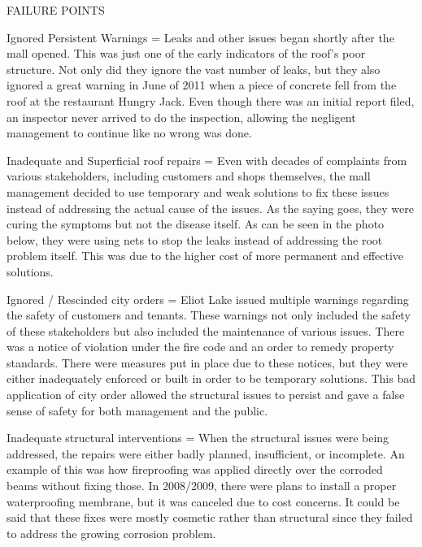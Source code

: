 \documentclass[12pt]{article}
\begin{document}
FAILURE POINTS

Ignored Persistent Warnings = Leaks and other issues began shortly after the mall opened. This was just one of the early indicators of the roof's poor structure. Not only did they ignore the vast number of leaks, but they also ignored a great warning in June of 2011 when a piece of concrete fell from the roof at the restaurant Hungry Jack. Even though there was an initial report filed, an inspector never arrived to do the inspection, allowing the negligent management to continue like no wrong was done.
 
Inadequate and Superficial roof repairs = Even with decades of complaints from various stakeholders, including customers and shops themselves, the mall management decided to use temporary and weak solutions to fix these issues instead of addressing the actual cause of the issues. As the saying goes, they were curing the symptoms but not the disease itself. As can be seen in the photo below, they were using nets to stop the leaks instead of addressing the root problem itself. This was due to the higher cost of more permanent and effective solutions.
  

 

 
Ignored / Rescinded city orders = Eliot Lake issued multiple warnings regarding the safety of customers and tenants. These warnings not only included the safety of these stakeholders but also included the maintenance of various issues. There was a notice of violation under the fire code and an order to remedy property standards. There were measures put in place due to these notices, but they were either inadequately enforced or built in order to be temporary solutions. This bad application of city order allowed the structural issues to persist and gave a false sense of safety for both management and the public.

 

 

 
Inadequate structural interventions = When the structural issues were being addressed, the repairs were either badly planned, insufficient, or incomplete. An example of this was how fireproofing was applied directly over the corroded beams without fixing those. In 2008/2009, there were plans to install a proper waterproofing membrane, but it was canceled due to cost concerns. It could be said that these fixes were mostly cosmetic rather than structural since they failed to address the growing corrosion problem.

 
\end{document}
